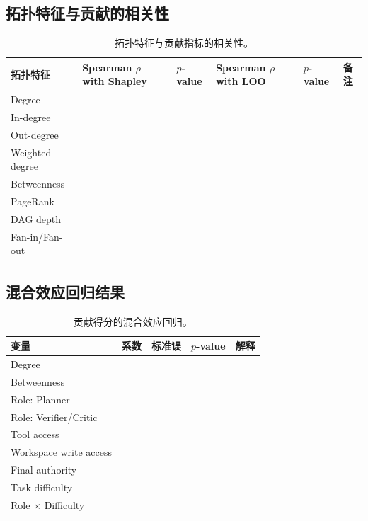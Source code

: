 \documentclass[UTF8,a4paper,11pt]{ctexart}
\begin{document}
\subsection{拓扑特征与贡献的相关性}

\begin{table}[H]
\centering
\caption{拓扑特征与贡献指标的相关性。}
\label{tab:topology-correlation}
\begin{tabularx}{\textwidth}{L{0.20\textwidth}C{0.13\textwidth}C{0.13\textwidth}C{0.13\textwidth}C{0.13\textwidth}Y}
\toprule
拓扑特征 & Spearman $\rho$ with Shapley & $p$-value & Spearman $\rho$ with LOO & $p$-value & 备注 \\
\midrule
Degree &  &  &  &  &  \\
In-degree &  &  &  &  &  \\
Out-degree &  &  &  &  &  \\
Weighted degree &  &  &  &  &  \\
Betweenness &  &  &  &  &  \\
PageRank &  &  &  &  &  \\
DAG depth &  &  &  &  &  \\
Fan-in/Fan-out &  &  &  &  &  \\
\bottomrule
\end{tabularx}
\end{table}

\subsection{混合效应回归结果}

\begin{table}[H]
\centering
\caption{贡献得分的混合效应回归。}
\label{tab:mixed-effects}
\begin{tabularx}{\textwidth}{L{0.28\textwidth}C{0.13\textwidth}C{0.13\textwidth}C{0.13\textwidth}Y}
\toprule
变量 & 系数 & 标准误 & $p$-value & 解释 \\
\midrule
Degree &  &  &  &  \\
Betweenness &  &  &  &  \\
Role: Planner &  &  &  &  \\
Role: Verifier/Critic &  &  &  &  \\
Tool access &  &  &  &  \\
Workspace write access &  &  &  &  \\
Final authority &  &  &  &  \\
Task difficulty &  &  &  &  \\
Role $\times$ Difficulty &  &  &  &  \\
\bottomrule
\end{tabularx}
\end{table}
\end{document}

